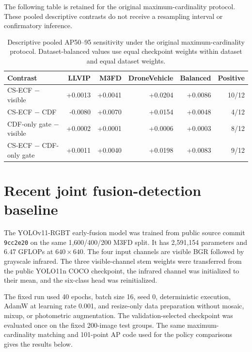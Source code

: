 \documentclass[11pt]{article}
\begin{document}
The following table is retained for the original maximum-cardinality protocol.
These pooled descriptive contrasts do not receive a resampling interval or
confirmatory inference.

\begin{table}[h]
\centering
\small
\caption{Descriptive pooled AP50--95 sensitivity under the original
maximum-cardinality protocol. Dataset-balanced values use equal checkpoint
weights within dataset and equal dataset weights.}
\begin{tabular}{@{}lrrrrr@{}}
\toprule
Contrast & LLVIP & M3FD & DroneVehicle & Balanced & Positive \\
\midrule
CS-ECF \(-\) visible & +0.0013 & +0.0041 & +0.0204 & +0.0086 & 10/12 \\
CS-ECF \(-\) CDF & -0.0080 & +0.0070 & +0.0154 & +0.0048 & 4/12 \\
CDF-only gate \(-\) visible & +0.0002 & +0.0001 & +0.0006 & +0.0003 & 8/12 \\
CS-ECF \(-\) CDF-only gate & +0.0011 & +0.0040 & +0.0198 & +0.0083 & 9/12 \\
\bottomrule
\end{tabular}
\end{table}

\section{Recent joint fusion-detection baseline}

The YOLOv11-RGBT early-fusion model was trained from public source commit
\texttt{9cc2e20} on the same 1,600/400/200 M3FD split. It has 2,591,154
parameters and 6.47 GFLOPs at \(640\times640\). The four input channels are
visible BGR followed by grayscale infrared. The three visible-channel stem
weights were transferred from the public YOLO11n COCO checkpoint, the infrared
channel was initialized to their mean, and the six-class head was
reinitialized.

The fixed run used 40 epochs, batch size 16, seed 0, deterministic execution,
AdamW at learning rate 0.001, and resize-only data preparation without mosaic,
mixup, or photometric augmentation. The validation-selected checkpoint was
evaluated once on the fixed 200-image test groups. The same
maximum-cardinality matching and 101-point AP code used for the policy
comparisons gives the results below.
\end{document}
